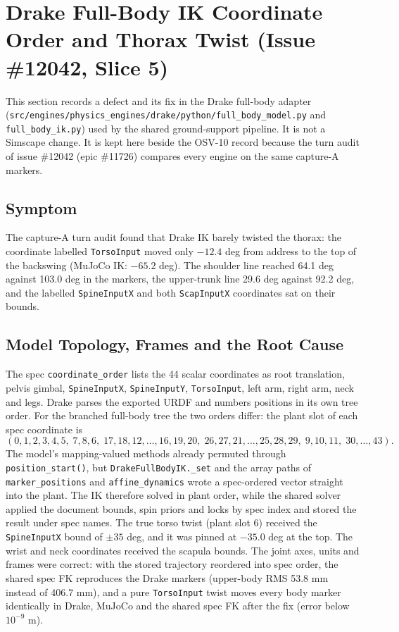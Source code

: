 \documentclass[11pt,a4paper]{article}
\begin{document}
\section{Drake Full-Body IK Coordinate Order and Thorax Twist (Issue \#12042, Slice 5)}
This section records a defect and its fix in the Drake full-body adapter
(\texttt{src/engines/physics\_engines/drake/python/full\_body\_model.py} and
\texttt{full\_body\_ik.py}) used by the shared ground-support pipeline. It is
not a Simscape change. It is kept here beside the OSV-10 record because the
turn audit of issue \#12042 (epic \#11726) compares every engine on the same
capture-A markers.

\subsection{Symptom}
The capture-A turn audit found that Drake IK barely twisted the thorax: the
coordinate labelled \texttt{TorsoInput} moved only $-12.4$ deg from address
to the top of the backswing (MuJoCo IK: $-65.2$ deg). The shoulder line
reached 64.1 deg against 103.0 deg in the markers, the upper-trunk line 29.6
deg against 92.2 deg, and the labelled \texttt{SpineInputX} and both
\texttt{ScapInputX} coordinates sat on their bounds.

\subsection{Model Topology, Frames and the Root Cause}
The spec \texttt{coordinate\_order} lists the 44 scalar coordinates as
root translation, pelvis gimbal, \texttt{SpineInputX}, \texttt{SpineInputY},
\texttt{TorsoInput}, left arm, right arm, neck and legs. Drake parses the
exported URDF and numbers positions in its own tree order. For the branched
full-body tree the two orders differ: the plant slot of each spec coordinate is
\[
(0,1,2,3,4,5,\;7,8,6,\;17,18,12,\dots,16,19,20,\;26,27,21,\dots,25,28,29,\;9,10,11,\;30,\dots,43).
\]
The model's mapping-valued methods already permuted through
\texttt{position\_start()}, but \texttt{DrakeFullBodyIK.\_set} and the array
paths of \texttt{marker\_positions} and \texttt{affine\_dynamics} wrote a
spec-ordered vector straight into the plant. The IK therefore solved in plant
order, while the shared solver applied the document bounds, spin priors and
locks by spec index and stored the result under spec names. The true torso
twist (plant slot 6) received the \texttt{SpineInputX} bound of $\pm35$ deg,
and it was pinned at $-35.0$ deg at the top. The wrist and neck coordinates
received the scapula bounds. The joint axes, units and frames were correct:
with the stored trajectory reordered into spec order, the shared spec FK
reproduces the Drake markers (upper-body RMS 53.8 mm instead of 406.7 mm), and
a pure \texttt{TorsoInput} twist moves every body marker identically in Drake,
MuJoCo and the shared spec FK after the fix (error below $10^{-9}$ m).
\end{document}

